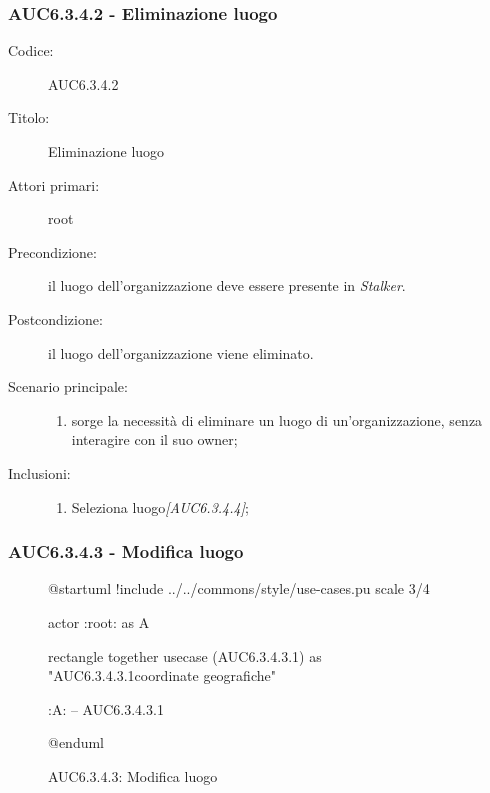 \documentclass[casi-duso]{subfiles}
\begin{document}
\subsubsection{AUC6.3.4.2 - Eliminazione luogo}%
\label{subsub:AUC6.3.4.2}
\begin{description}
  \item[Codice:] AUC6.3.4.2
  \item[Titolo:] Eliminazione luogo
  \item[Attori primari:] root
  \item[Precondizione:] il luogo dell'organizzazione deve essere presente in \emph{Stalker}.
  \item[Postcondizione:] il luogo dell'organizzazione viene eliminato.
  \item[Scenario principale:]
  \begin{enumerate}
    \item sorge la necessità di eliminare un luogo di un'organizzazione, senza interagire con il suo owner;
  \end{enumerate}
  \item[Inclusioni:]
  \begin{enumerate}
    \item Seleziona luogo\emph{[AUC6.3.4.4]};
  \end{enumerate}
\end{description}

\subsubsection{AUC6.3.4.3 - Modifica luogo}%
\label{subsub:AUC6.3.4.3}

\begin{figure}[h!]
  \centering
  \begin{plantuml}
  @startuml
  !include ../../commons/style/use-cases.pu
  scale 3/4

  actor :root: as A

  rectangle {
    together {
      usecase (AUC6.3.4.3.1) as "AUC6.3.4.3.1\nModifica coordinate geografiche"
    }
  }

  :A: -- AUC6.3.4.3.1

  @enduml
  \end{plantuml}
  \caption{AUC6.3.4.3: Modifica luogo}
  \label{fig:auc6_3_4_3}
\end{figure}
\end{document}
